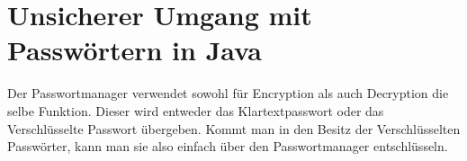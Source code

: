 \documentclass[12pt]{article}
\theoremstyle{plain}
\begin{document}
\section{Unsicherer Umgang mit Passwörtern in Java}
Der Passwortmanager verwendet sowohl für Encryption als auch Decryption die selbe Funktion. Dieser wird entweder das Klartextpasswort oder das Verschlüsselte Passwort übergeben. Kommt man in den Besitz der Verschlüsselten Passwörter, kann man sie also einfach über den Passwortmanager entschlüsseln.
\end{document}
